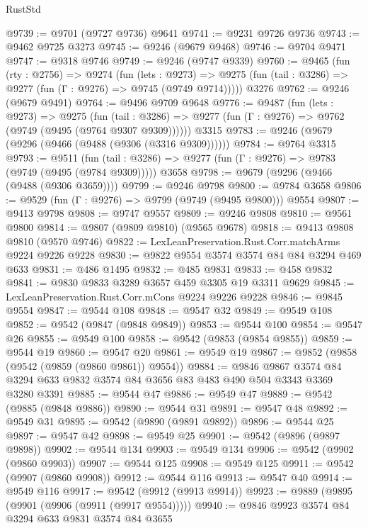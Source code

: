\begin{lexlean}{RustStd}
\begin{coremodule}
{\begin{coremodule}
{{{{{{{{{{{{{{{{{{{{{{{{{{{{{{{{{@9739 := @9701 (@9727 @9736) @9641
@9741 := @9231 @9726 @9736
@9743 := @9462 @9725 @3273
@9745 := @9246 (@9679 @9468)
@9746 := @9704 @9471
@9747 := @9318 @9746
@9749 := @9246 (@9747 @9339)
@9760 := @9465
    (fun (rty : @2756) =>
    @9274
      (fun (lets : @9273) =>
      @9275 (fun (tail : @3286) => @9277 (fun (Γ : @9276) => @9745 (@9749 @9714)))))
    @3276
@9762 := @9246 (@9679 @9491)
@9764 := @9496 @9709 @9648
@9776 := @9487
    (fun (lets : @9273) =>
    @9275
      (fun (tail : @3286) => @9277 (fun (Γ : @9276) => @9762 (@9749 (@9495 (@9764 @9307 @9309))))))
    @3315
@9783 := @9246 (@9679 (@9296 (@9466 (@9488 (@9306 (@3316 @9309))))))
@9784 := @9764 @3315
@9793 := @9511
    (fun (tail : @3286) => @9277 (fun (Γ : @9276) => @9783 (@9749 (@9495 (@9784 @9309)))))
    @3658
@9798 := @9679 (@9296 (@9466 (@9488 (@9306 @3659))))
@9799 := @9246 @9798
@9800 := @9784 @3658
@9806 := @9529 (fun (Γ : @9276) => @9799 (@9749 (@9495 @9800))) @9554
@9807 := @9413 @9798
@9808 := @9747 @9557
@9809 := @9246 @9808
@9810 := @9561 @9800
@9814 := @9807 (@9809 @9810) (@9565 @9678)
@9818 := @9413 @9808 @9810 (@9570 @9746)
@9822 := LexLeanPreservation.Rust.Corr.matchArms @9224 @9226 @9228
@9830 := @9822 @9554 @3574 @3574 @84 @84 @3294 @469 @633
@9831 := @486 @1495
@9832 := @485 @9831
@9833 := @458 @9832
@9841 := @9830 @9833 @3289 @3657 @459 @3305 @19 @3311 @9629
@9845 := LexLeanPreservation.Rust.Corr.mCons @9224 @9226 @9228
@9846 := @9845 @9554
@9847 := @9544 @108
@9848 := @9547 @32
@9849 := @9549 @108
@9852 := @9542 (@9847 (@9848 @9849))
@9853 := @9544 @100
@9854 := @9547 @26
@9855 := @9549 @100
@9858 := @9542 (@9853 (@9854 @9855))
@9859 := @9544 @19
@9860 := @9547 @20
@9861 := @9549 @19
@9867 := @9852 (@9858 (@9542 (@9859 (@9860 @9861)) @9554))
@9884 := @9846
    @9867
    @3574
    @84
    @3294
    @633
    @9832
    @3574
    @84
    @3656
    @83
    @483
    @490
    @504
    @3343
    @3369
    @3280
    @3391
@9885 := @9544 @47
@9886 := @9549 @47
@9889 := @9542 (@9885 (@9848 @9886))
@9890 := @9544 @31
@9891 := @9547 @48
@9892 := @9549 @31
@9895 := @9542 (@9890 (@9891 @9892))
@9896 := @9544 @25
@9897 := @9547 @42
@9898 := @9549 @25
@9901 := @9542 (@9896 (@9897 @9898))
@9902 := @9544 @134
@9903 := @9549 @134
@9906 := @9542 (@9902 (@9860 @9903))
@9907 := @9544 @125
@9908 := @9549 @125
@9911 := @9542 (@9907 (@9860 @9908))
@9912 := @9544 @116
@9913 := @9547 @40
@9914 := @9549 @116
@9917 := @9542 (@9912 (@9913 @9914))
@9923 := @9889 (@9895 (@9901 (@9906 (@9911 (@9917 @9554)))))
@9940 := @9846
    @9923
    @3574
    @84
    @3294
    @633
    @9831
    @3574
    @84
    @3655
}}}}}}}}}}}}}}}}}}}}}}}}}}}}}}}}}
\end{coremodule}}
\end{coremodule}
\end{lexlean}
